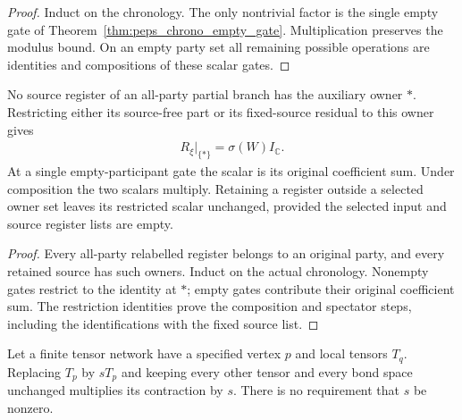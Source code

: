 \begin{proof}
    \leanok
    Induct on the chronology. The only nontrivial factor is the single empty gate
    of Theorem~\ref{thm:peps_chrono_empty_gate}. Multiplication preserves the
    modulus bound. On an empty party set all remaining possible operations are
    identities and compositions of these scalar gates.
\end{proof}

\begin{theorem}
    \label{thm:peps_chrono_none_scalar}
    \leanok
    No source register of an all-party partial branch has the auxiliary owner
    $\ast$. Restricting either its source-free part or its fixed-source residual
    to this owner gives
    \begin{align}
        R_\xi|_{\{\ast\}}=\sigma(W)I_{\mathbb C}.
        \label{eq:peps_chrono_none_scalar}
    \end{align}
    At a single empty-participant gate the scalar is its original coefficient
    sum. Under composition the two scalars multiply. Retaining a register outside
    a selected owner set leaves its restricted scalar unchanged, provided the
    selected input and source register lists are empty.
\end{theorem}

\begin{proof}
    \leanok
    Every all-party relabelled register belongs to an original party, and every
    retained source has such owners. Induct on the actual chronology. Nonempty
    gates restrict to the identity at $\ast$; empty gates contribute their original
    coefficient sum. The restriction identities prove the composition and
    spectator steps, including the identifications with the fixed source list.
\end{proof}

\begin{theorem}
    \label{thm:peps_chrono_scalar_absorption}
    \leanok
    Let a finite tensor network have a specified vertex $p$ and local tensors
    $T_q$. Replacing $T_p$ by $sT_p$ and keeping every other tensor and every
    bond space unchanged multiplies its contraction by $s$.
    There is no requirement that $s$ be nonzero.
\end{theorem}

